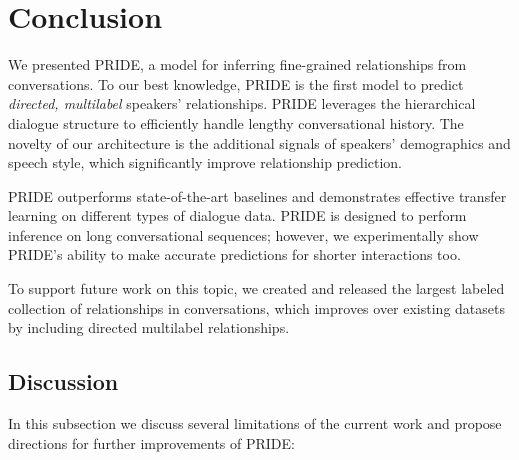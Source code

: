 \section{Conclusion}

We presented PRIDE, a model for inferring fine-grained relationships from conversations. To our best knowledge, PRIDE is the first model to predict \textit{directed, multilabel} speakers' relationships. PRIDE leverages the hierarchical dialogue structure to efficiently handle lengthy conversational history. The novelty of our architecture is the additional signals of speakers' demographics and speech style, which significantly improve relationship prediction.

PRIDE outperforms state-of-the-art baselines and demonstrates effective transfer learning on different types of dialogue data. %
PRIDE is designed to perform inference on long conversational sequences; however, we experimentally show PRIDE's ability to make accurate predictions for shorter interactions too. 

To support future work on this topic, we created and released the largest labeled collection of relationships in conversations, which improves over existing datasets by including directed multilabel relationships.

\subsection{Discussion}

In this subsection we discuss several limitations of the current work and propose directions for further improvements of PRIDE:


